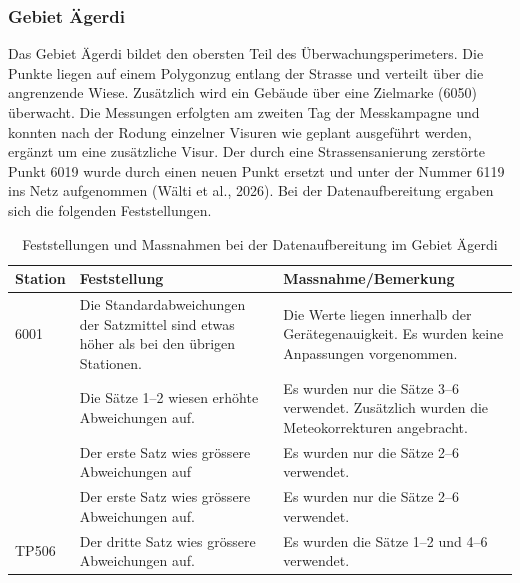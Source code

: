 \subsubsection{Gebiet Ägerdi}
\label{sec:gebiet-aegerdi}
Das Gebiet Ägerdi bildet den obersten Teil des Überwachungsperimeters.
Die Punkte liegen auf einem Polygonzug entlang der Strasse und verteilt
über die angrenzende Wiese. Zusätzlich wird ein Gebäude über eine
Zielmarke (6050) überwacht. Die Messungen erfolgten am zweiten Tag der
Messkampagne und konnten nach der Rodung einzelner Visuren wie geplant
ausgeführt werden, ergänzt um eine zusätzliche Visur. Der durch eine
Strassensanierung zerstörte Punkt 6019 wurde durch einen neuen Punkt
ersetzt und unter der Nummer 6119 ins Netz aufgenommen (Wälti et al., 2026). Bei der Datenaufbereitung
ergaben sich die folgenden Feststellungen.

\begin{table}[htbp]
    \centering
    \begin{tabularx}{\textwidth}{p{2.2cm} X X}
        \toprule
        Station & Feststellung & Massnahme/Bemerkung \\
        \midrule
        6001 & Die Standardabweichungen der Satzmittel sind etwas höher
        als bei den übrigen Stationen. & Die Werte liegen innerhalb der
        Gerätegenauigkeit. Es wurden keine Anpassungen vorgenommen. \\
        \addlinespace
        6003 & Die Sätze 1--2 wiesen erhöhte Abweichungen auf. &
        Es wurden nur die Sätze 3--6 verwendet.
        Zusätzlich wurden die Meteokorrekturen angebracht. \\
        \addlinespace
        6016 & Der erste Satz wies grössere Abweichungen auf &
        Es wurden nur die Sätze 2--6 verwendet. \\
        \addlinespace
        7001 & Der erste Satz wies grössere Abweichungen auf. &
        Es wurden nur die Sätze 2--6 verwendet. \\
        \addlinespace
        TP506 & Der dritte Satz wies grössere Abweichungen auf. &
        Es wurden die Sätze 1--2 und 4--6 verwendet. \\
        \bottomrule
    \end{tabularx}
    \caption{Feststellungen und Massnahmen bei der Datenaufbereitung
    im Gebiet Ägerdi}
    \label{tab:feststellungen-aegerdi}
\end{table}

